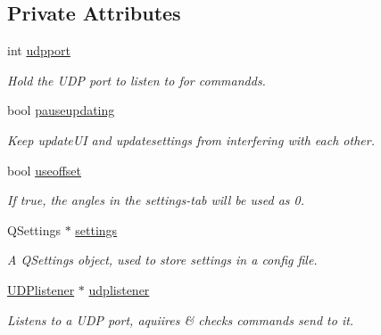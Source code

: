 \subsection*{Private Attributes}
\begin{DoxyCompactItemize}
\item 
\mbox{\label{classcagecontrol_ae73f9b22e1cc81ef92d900b8c63b4663}} 
int \hyperlink{classcagecontrol_ae73f9b22e1cc81ef92d900b8c63b4663}{udpport}
\begin{DoxyCompactList}\small\item\em Hold the U\+DP port to listen to for commandds. \end{DoxyCompactList}\item 
\mbox{\label{classcagecontrol_aadbcbafcce2b4e49b83560d308086f87}} 
bool \hyperlink{classcagecontrol_aadbcbafcce2b4e49b83560d308086f87}{pauseupdating}
\begin{DoxyCompactList}\small\item\em Keep update\+UI and updatesettings from interfering with each other. \end{DoxyCompactList}\item 
bool \hyperlink{classcagecontrol_aaae4d96e61ebe50baf65014003208ac0}{useoffset}
\begin{DoxyCompactList}\small\item\em If true, the angles in the settings-\/tab will be used as \textquotesingle{}0\textquotesingle{}. \end{DoxyCompactList}\item 
\mbox{\label{classcagecontrol_aaa56b3d1bbf35785c21c5465eef48185}} 
Q\+Settings $\ast$ \hyperlink{classcagecontrol_aaa56b3d1bbf35785c21c5465eef48185}{settings}
\begin{DoxyCompactList}\small\item\em A Q\+Settings object, used to store settings in a config file. \end{DoxyCompactList}\item 
\mbox{\label{classcagecontrol_a6c281db6d7f0de7964c49bac0d5823b7}} 
\hyperlink{classUDPlistener}{U\+D\+Plistener} $\ast$ \hyperlink{classcagecontrol_a6c281db6d7f0de7964c49bac0d5823b7}{udplistener}
\begin{DoxyCompactList}\small\item\em Listens to a U\+DP port, aquiires \& checks commands send to it. \end{DoxyCompactList}\item 

\end{DoxyCompactItemize}
